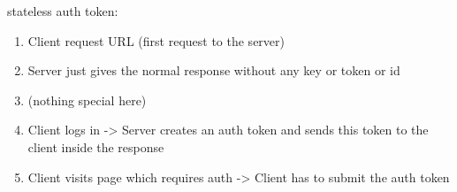 stateless auth token:

\begin{enumerate}
\item Client request URL (first request to the server)
\item Server just gives the normal response without any key or token or id
\item (nothing special here)
\item Client logs in -> Server creates an auth token and sends this token to the client inside the response
\item Client visits page which requires auth -> Client has to submit the auth token
\end{enumerate}


